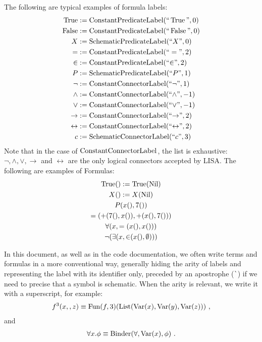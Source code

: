 \begin{ex}[Formula]The following are typical examples of formula labels:
  \begin{align*}
    \operatorname{True}           & := \operatorname{ConstantPredicateLabel}(``\operatorname{True}", 0)             \\
    \operatorname{False}          & := \operatorname{ConstantPredicateLabel}(``\operatorname{False}", 0)            \\
    X               & := \operatorname{SchematicPredicateLabel}(``X", 0)                \\
    =               & := \operatorname{ConstantPredicateLabel}(``=", 2)                 \\
    {\in}           & := \operatorname{ConstantPredicateLabel}(``{\in}", 2)             \\
    P               & := \operatorname{SchematicPredicateLabel}(``P", 1)                \\
    \neg            & := \operatorname{ConstantConnectorLabel}(``{\neg}", 1)            \\
    \land           & := \operatorname{ConstantConnectorLabel}(``{\land}", -1)          \\
    \lor            & := \operatorname{ConstantConnectorLabel}(``{\lor}", -1)           \\
    \rightarrow     & := \operatorname{ConstantConnectorLabel}(``{\rightarrow}", 2)     \\
    \leftrightarrow & := \operatorname{ConstantConnectorLabel}(``{\leftrightarrow}", 2) \\
    c               & := \operatorname{SchematicConnectorLabel}(``{c}", 3)              \\
  \end{align*}
  Note that in the case of $\operatorname{ConstantConnectorLabel}$, the list is exhaustive: $\neg, \land, \lor, \rightarrow$ and $\leftrightarrow$ are the only logical connectors accepted by LISA.
  The following are examples of Formulas:
  \begin{gather*}
    \operatorname{True}() := \operatorname{True}(\operatorname{Nil})\\
    X() := X(\operatorname{Nil})\\
    P(x(), 7()) \\
    =(+(7(), x()), +(x(), 7()))\\
    \forall(x, =(x(), x())) \\
    \neg(\exists(x, {\in}(x(), \emptyset)))
  \end{gather*}
\end{ex}

In this document, as well as in the code documentation, we often write terms and formulas in a more conventional way, generally hiding the arity of labels and representing the label with its identifier only, preceded by an apostrophe (\lstinline|`|) if we need to precise that a symbol is schematic. When the arity is relevant, we write it with a superscript, for example:
%
\begin{gather*}
  f^3(x,,z) \equiv \operatorname{Fun}(f, 3)(\operatorname{List}(\operatorname{Var}(x), \operatorname{Var}(y), \operatorname{Var}(z)))~,
\end{gather*}
%
and
%
\begin{gather*}
  \forall x. \phi \equiv \operatorname{Binder}(\forall, \operatorname{Var}(x), \phi)~.
\end{gather*}

